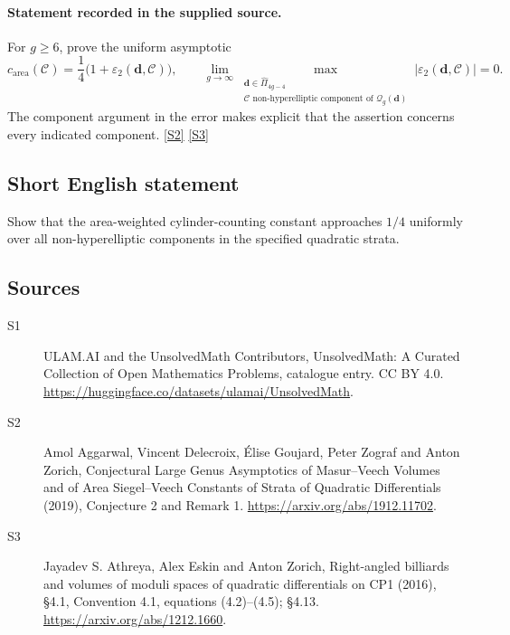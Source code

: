 \documentclass[11pt]{article}
\newcommand{\sref}[2]{\hyperlink{source:#1:#2}{[S#2]}}
\begin{document}
\paragraph{Statement recorded in the supplied source.}
For $g\ge6$, prove the uniform asymptotic
\[
 c_{\mathrm{area}}(\mathcal C)=\frac14\bigl(1+\varepsilon_2(\boldsymbol d,\mathcal C)\bigr),\qquad
 \lim_{g\to\infty}\max_{\substack{\boldsymbol d\in\widehat\Pi_{4g-4}\\\mathcal C\text{ non-hyperelliptic component of }\mathcal Q_g(\boldsymbol d)}}
 |\varepsilon_2(\boldsymbol d,\mathcal C)|=0.
\]
The component argument in the error makes explicit that the assertion concerns every indicated component. \sref{statement}{2} \sref{statement}{3}
\subsection{Short English statement}
Show that the area-weighted cylinder-counting constant approaches $1/4$ uniformly over all non-hyperelliptic components in the specified quadratic strata.
\subsection{Sources}
\begin{description}
\item[\hypertarget{source:statement:1}{S1}] ULAM.AI and the UnsolvedMath Contributors, UnsolvedMath: A Curated Collection of Open Mathematics Problems, catalogue entry. CC BY 4.0. \url{https://huggingface.co/datasets/ulamai/UnsolvedMath}.
\item[\hypertarget{source:statement:2}{S2}] Amol Aggarwal, Vincent Delecroix, Élise Goujard, Peter Zograf and Anton Zorich, Conjectural Large Genus Asymptotics of Masur–Veech Volumes and of Area Siegel–Veech Constants of Strata of Quadratic Differentials (2019), Conjecture 2 and Remark 1. \url{https://arxiv.org/abs/1912.11702}.
\item[\hypertarget{source:statement:3}{S3}] Jayadev S. Athreya, Alex Eskin and Anton Zorich, Right-angled billiards and volumes of moduli spaces of quadratic differentials on CP1 (2016), §4.1, Convention 4.1, equations (4.2)–(4.5); §4.13. \url{https://arxiv.org/abs/1212.1660}.
\end{description}
\label{end:statement}
\end{document}
